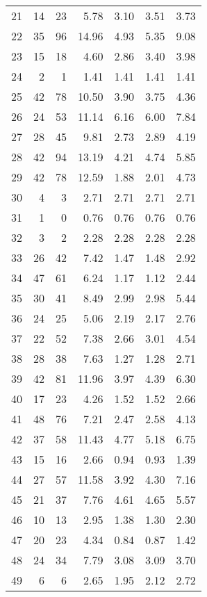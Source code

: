 \begin{longtable}{rrrrrrr}
   21 &  14 &  23 & 5.78 & 3.10 & 3.51 & 3.73 \\ 
   22 &  35 &  96 & 14.96 & 4.93 & 5.35 & 9.08 \\ 
   23 &  15 &  18 & 4.60 & 2.86 & 3.40 & 3.98 \\ 
   24 &   2 &   1 & 1.41 & 1.41 & 1.41 & 1.41 \\ 
   25 &  42 &  78 & 10.50 & 3.90 & 3.75 & 4.36 \\ 
   26 &  24 &  53 & 11.14 & 6.16 & 6.00 & 7.84 \\ 
   27 &  28 &  45 & 9.81 & 2.73 & 2.89 & 4.19 \\ 
   28 &  42 &  94 & 13.19 & 4.21 & 4.74 & 5.85 \\ 
   29 &  42 &  78 & 12.59 & 1.88 & 2.01 & 4.73 \\ 
   30 &   4 &   3 & 2.71 & 2.71 & 2.71 & 2.71 \\ 
   31 &   1 &   0 & 0.76 & 0.76 & 0.76 & 0.76 \\ 
   32 &   3 &   2 & 2.28 & 2.28 & 2.28 & 2.28 \\ 
   33 &  26 &  42 & 7.42 & 1.47 & 1.48 & 2.92 \\ 
   34 &  47 &  61 & 6.24 & 1.17 & 1.12 & 2.44 \\ 
   35 &  30 &  41 & 8.49 & 2.99 & 2.98 & 5.44 \\ 
   36 &  24 &  25 & 5.06 & 2.19 & 2.17 & 2.76 \\ 
   37 &  22 &  52 & 7.38 & 2.66 & 3.01 & 4.54 \\ 
   38 &  28 &  38 & 7.63 & 1.27 & 1.28 & 2.71 \\ 
   39 &  42 &  81 & 11.96 & 3.97 & 4.39 & 6.30 \\ 
   40 &  17 &  23 & 4.26 & 1.52 & 1.52 & 2.66 \\ 
   41 &  48 &  76 & 7.21 & 2.47 & 2.58 & 4.13 \\ 
   42 &  37 &  58 & 11.43 & 4.77 & 5.18 & 6.75 \\ 
   43 &  15 &  16 & 2.66 & 0.94 & 0.93 & 1.39 \\ 
   44 &  27 &  57 & 11.58 & 3.92 & 4.30 & 7.16 \\ 
   45 &  21 &  37 & 7.76 & 4.61 & 4.65 & 5.57 \\ 
   46 &  10 &  13 & 2.95 & 1.38 & 1.30 & 2.30 \\ 
   47 &  20 &  23 & 4.34 & 0.84 & 0.87 & 1.42 \\ 
   48 &  24 &  34 & 7.79 & 3.08 & 3.09 & 3.70 \\ 
   49 &   6 &   6 & 2.65 & 1.95 & 2.12 & 2.72 \\ 

\end{longtable}
